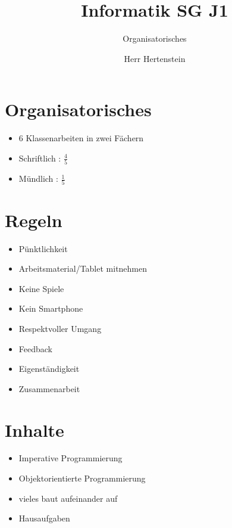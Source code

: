 \documentclass{beamer}
\title{Informatik SG J1}
\subtitle{Organisatorisches}
\author{Herr Hertenstein}
\date{}
\begin{document}
    \begin{frame}
        \maketitle
    \end{frame}
    
    \section{Organisatorisches}
	
	\begin{frame}[plain]
	\begin{itemize}
	\item 6 Klassenarbeiten in zwei Fächern
	\item Schriftlich : $\frac{4}{5}$ 
	\item Mündlich : $\frac{1}{5}$ 
	\end{itemize}
	\end{frame}

		\section{Regeln}

	\begin{frame}[plain]
	\begin{itemize}
	\item Pünktlichkeit
	\item Arbeitsmaterial/Tablet mitnehmen
	\item Keine Spiele 
	\item Kein Smartphone
	\item Respektvoller Umgang
	\item Feedback
 	\item Eigenständigkeit
	\item Zusammenarbeit
	\end{itemize}
\end{frame}

	\section{Inhalte}
		\begin{frame}[plain]
	\begin{itemize}
	\item Imperative Programmierung
	\item Objektorientierte Programmierung
	\item vieles baut aufeinander auf
	\item Hausaufgaben
	\end{itemize}
	\end{frame}
\end{document}

